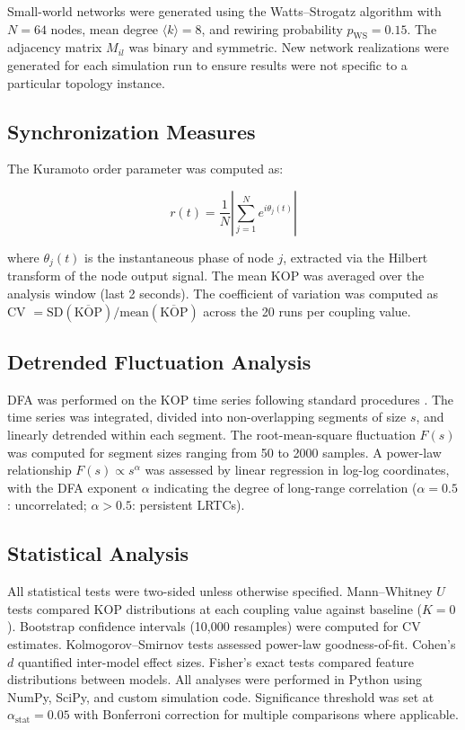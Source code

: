 \documentclass[11pt]{article}
\begin{document}
Small-world networks were generated using the Watts--Strogatz algorithm \citep{watts1998collective} with $N = 64$ nodes, mean degree $\langle k \rangle = 8$, and rewiring probability $p_{\text{WS}} = 0.15$. The adjacency matrix $M_{il}$ was binary and symmetric. New network realizations were generated for each simulation run to ensure results were not specific to a particular topology instance.

\subsection{Synchronization Measures}

The Kuramoto order parameter was computed as:

\begin{equation}
r(t) = \frac{1}{N} \left| \sum_{j=1}^{N} e^{i\theta_j(t)} \right|
\end{equation}

\noindent where $\theta_j(t)$ is the instantaneous phase of node $j$, extracted via the Hilbert transform of the node output signal. The mean KOP was averaged over the analysis window (last 2 seconds). The coefficient of variation was computed as CV $= \text{SD}(\overline{\text{KOP}}) / \text{mean}(\overline{\text{KOP}})$ across the 20 runs per coupling value.

\subsection{Detrended Fluctuation Analysis}

DFA was performed on the KOP time series following standard procedures \citep{peng1994mosaic}. The time series was integrated, divided into non-overlapping segments of size $s$, and linearly detrended within each segment. The root-mean-square fluctuation $F(s)$ was computed for segment sizes ranging from 50 to 2000 samples. A power-law relationship $F(s) \propto s^\alpha$ was assessed by linear regression in log-log coordinates, with the DFA exponent $\alpha$ indicating the degree of long-range correlation ($\alpha = 0.5$: uncorrelated; $\alpha > 0.5$: persistent LRTCs).

\subsection{Statistical Analysis}

All statistical tests were two-sided unless otherwise specified. Mann--Whitney $U$ tests compared KOP distributions at each coupling value against baseline ($K = 0$). Bootstrap confidence intervals (10,000 resamples) were computed for CV estimates. Kolmogorov--Smirnov tests assessed power-law goodness-of-fit. Cohen's $d$ quantified inter-model effect sizes. Fisher's exact tests compared feature distributions between models. All analyses were performed in Python using NumPy, SciPy, and custom simulation code. Significance threshold was set at $\alpha_{\text{stat}} = 0.05$ with Bonferroni correction for multiple comparisons where applicable.
\end{document}
